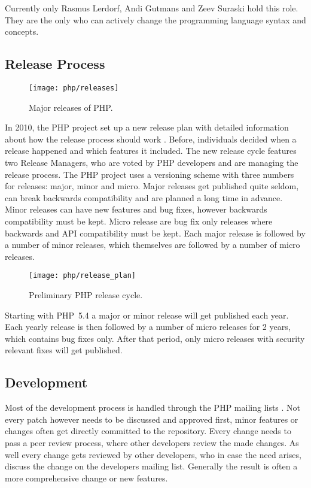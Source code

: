 Currently only Rasmus Lerdorf, Andi Gutmans and Zeev Suraski hold this role.
They are the only who can actively change the programming language syntax and
concepts.


\subsection{Release Process} %

\begin{figure}[bhtp]
  \centering
  \texttt{[image: php/releases]}
  \caption[Major Releases of PHP]{Major releases of PHP.}
\end{figure}

In 2010, the PHP project set up a new release plan with detailed information
about how the release process should work \cite{PHPRelease}. Before,
individuals decided when a release happened and which features it included. The
new release cycle features two Release Managers, who are voted by PHP
developers and are managing the release process. The PHP project uses a
versioning scheme with three numbers for releases: major, minor and micro.
Major releases get published quite seldom, can break backwards compatibility
and are planned a long time in advance. Minor releases can have new features
and bug fixes, however backwards compatibility must be kept. Micro release are
bug fix only releases where backwards and \ac{API} compatibility must be kept.
Each major release is followed by a number of minor releases, which themselves
are followed by a number of micro releases.

\begin{figure}[thbp]
  \centering
  \texttt{[image: php/release\_plan]}
  \caption[Preliminary PHP Release Cycle]{Preliminary PHP release cycle.}
\end{figure}

Starting with PHP~5.4 a major or minor release will get published each year.
Each yearly release is then followed by a number of micro releases for 2 years,
which contains bug fixes only. After that period, only micro releases with
security relevant fixes will get published.


\subsection{Development} %

Most of the development process is handled through the PHP mailing lists
\cite{PHPRelease,Magnusson2010,PHPVoting}. Not every patch however needs to be
discussed and approved first, minor features or changes often get directly
committed to the repository. Every change needs to pass a peer review process,
where other developers review the made changes. As well every change gets
reviewed by other developers, who in case the need arises, discuss the change
on the developers mailing list. Generally the result is often a more
comprehensive change or new features.

